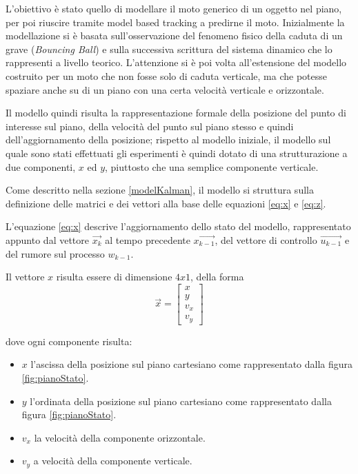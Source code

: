L'obiettivo è stato quello di modellare il moto generico di un oggetto nel piano, per poi riuscire tramite model based tracking a predirne il moto. Inizialmente la modellazione si è basata sull'osservazione del fenomeno fisico della caduta di un grave (\textit{Bouncing Ball}) e sulla successiva scrittura del sistema dinamico che lo rappresenti a livello teorico. L'attenzione si è poi volta all'estensione del modello costruito per un moto che non fosse solo di caduta verticale, ma che potesse spaziare anche su di un piano con una certa velocità verticale e orizzontale. 

Il modello quindi risulta la rappresentazione formale della posizione del punto di interesse sul piano, della velocità del punto sul piano stesso e quindi dell'aggiornamento della posizione; rispetto al modello iniziale, il modello sul quale sono stati effettuati gli esperimenti è quindi dotato di una strutturazione a due componenti, $x$ ed $y$, piuttosto che una semplice componente verticale.%

Come descritto nella sezione \ref{modelKalman}, il modello si struttura sulla definizione delle matrici e dei vettori alla base delle equazioni \ref{eq:x} e \ref{eq:z}.

L'equazione \ref{eq:x} descrive l'aggiornamento dello stato del modello, rappresentato appunto dal vettore $\overrightarrow{x_k}$ al tempo precedente $\overrightarrow{x_{k-1}}$, del vettore di controllo $\overrightarrow{u_{k-1}}$ e del rumore sul processo $w_{k-1}$. 

Il vettore $x$ risulta essere di dimensione $4 x 1$, della forma 
\begin{equation}\label{eq:vettoreX}
 \overrightarrow{x}=\begin{bmatrix} x \\ y \\ v_x \\ v_y \end{bmatrix}
\end{equation} 

dove ogni componente risulta:
\begin{itemize}
\item $x$ l'ascissa della posizione sul piano cartesiano come rappresentato dalla figura \ref{fig:pianoStato}.
\item $y$ l'ordinata della posizione sul piano cartesiano come rappresentato dalla figura \ref{fig:pianoStato}.
\item $v_x$ la velocità della componente orizzontale.
\item $v_y$ a velocità della componente verticale.
\end{itemize}

